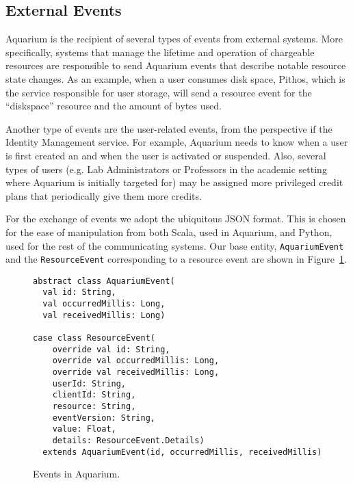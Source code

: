 \documentclass[preprint,10pt]{sigplanconf}
\begin{document}
\subsection{External Events}
Aquarium is the recipient of several types of events from external systems. More specifically, systems that manage the lifetime and operation of chargeable resources are responsible to send Aquarium events that describe notable resource state changes. As an example, when a user consumes disk space, Pithos, which is the service responsible for user storage, will send a resource event for the ``diskspace'' resource and the amount of bytes used.

Another type of events are the user-related events, from the perspective if the Identity Management service. For example, Aquarium needs to know when a user is first created an and when the user is activated or suspended. Also, several types of users (e.g. Lab Administrators or Professors in the academic setting where Aquarium is initially targeted for) may be assigned more privileged credit plans that periodically give them more credits.

For the exchange of events we adopt the ubiquitous JSON format. This is chosen for the ease of manipulation from both Scala, used in Aquarium, and Python, used for the rest of the communicating systems. Our base entity, \texttt{AquariumEvent} and the \texttt{ResourceEvent} corresponding to a resource event are shown in Figure~\ref{fig:aqevent}.

\begin{figure}
\lstset{language=c, basicstyle=\footnotesize,
stringstyle=\ttfamily, 
flexiblecolumns=true, aboveskip=-0.9em, belowskip=0em, lineskip=0em}

\begin{lstlisting}
abstract class AquariumEvent(
  val id: String,
  val occurredMillis: Long,
  val receivedMillis: Long)
  
case class ResourceEvent(
    override val id: String,
    override val occurredMillis: Long, 
    override val receivedMillis: Long, 
    userId: String,
    clientId: String,               
    resource: String,
    eventVersion: String,
    value: Float,
    details: ResourceEvent.Details)
  extends AquariumEvent(id, occurredMillis, receivedMillis)
\end{lstlisting}
\caption{Events in Aquarium.}
\label{fig:aqevent}
\end{figure}
\end{document}
